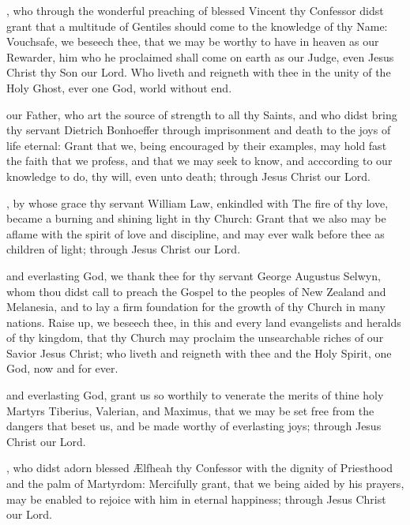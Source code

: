 , who through the wonderful preaching of blessed Vincent thy Confessor didst grant that a multitude of Gentiles should come to the knowledge of thy Name: Vouchsafe, we beseech thee, that we may be worthy to have in heaven as our Rewarder, him who he proclaimed shall come on earth as our Judge, even Jesus Christ thy Son our Lord. Who liveth and reigneth with thee in the unity of the Holy Ghost, ever one God, world without end.

 our Father, who art the source of strength to all thy Saints, and who didst bring thy servant Dietrich Bonhoeffer through imprisonment and death to the joys of life eternal: Grant that we, being encouraged by their examples, may hold fast the faith that we profess, and that we may seek to know, and acccording to our knowledge to do, thy will, even unto death; through Jesus Christ our Lord.

, by whose grace thy servant William Law, enkindled with The fire of thy love, became a burning and shining light in thy Church: Grant that we also may be aflame with the spirit of love and discipline, and may ever walk before thee as children of light; through Jesus Christ our Lord.

 and everlasting God, we thank thee for thy servant George Augustus Selwyn, whom thou didst call to preach the Gospel to the peoples of New Zealand and Melanesia, and to lay a firm foundation for the growth of thy Church in many nations. Raise up, we beseech thee, in this and every land evangelists and heralds of thy kingdom, that thy Church may proclaim the unsearchable riches of our Savior Jesus Christ; who liveth and reigneth with thee and the Holy Spirit, one God, now and for ever.

 and everlasting God, grant us so worthily to venerate the merits of thine holy Martyrs Tiberius, Valerian, and Maximus, that we may be set free from the dangers that beset us, and be made worthy of everlasting joys; through Jesus Christ our Lord.

, who didst adorn blessed Ælfheah thy Confessor with the dignity of Priesthood and the palm of Martyrdom: Mercifully grant, that we being aided by his prayers, may be enabled to rejoice with him in eternal happiness; through Jesus Christ our Lord.

